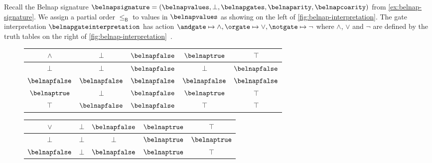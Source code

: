 \documentclass{lmcs}
\begin{document}
\begin{exa}\label{ex:belnap-interpretation}
    Recall the Belnap signature \(
    \belnapsignature = (
    \belnapvalues, \bot, \belnapgates, \belnaparity, \belnapcoarity
    )
    \) from \autoref{ex:belnap-signature}.
    We assign a partial order \(\leq_\mathsf{B}\) to values in
    \(\belnapvalues\) as showing on the left of
    \autoref{fig:belnap-interpretation}.
    The gate interpretation \(\belnapgateinterpretation\) has action \(
    \andgate \mapsto \land, \orgate \mapsto \lor, \notgate \mapsto \neg
    \) where \(\land\), \(\lor\) and \(\neg\) are defined by the truth tables
    on the right of \autoref{fig:belnap-interpretation}~\cite{belnap1977useful}.

    \begin{figure*}
        \centering
        \qquad\qquad
        \begin{tabular}{|c|cccc|}
            \hline
            \(\land\)        & \(\bot\)         & \(\belnapfalse\) & \(\belnaptrue\)  & \(\top\)         \\
            \hline
            \(\bot\)         & \(\bot\)         & \(\belnapfalse\) & \(\bot\)         & \(\belnapfalse\) \\
            \(\belnapfalse\) & \(\belnapfalse\) & \(\belnapfalse\) & \(\belnapfalse\) & \(\belnapfalse\) \\
            \(\belnaptrue\)  & \(\bot\)         & \(\belnapfalse\) & \(\belnaptrue\)  & \(\top\)         \\
            \(\top\)         & \(\belnapfalse\) & \(\belnapfalse\) & \(\top\)         & \(\top\)         \\
            \hline
        \end{tabular}
        \quad
        \begin{tabular}{|c|cccc|}
            \hline
            \(\lor\)         & \(\bot\)        & \(\belnapfalse\) & \(\belnaptrue\) & \(\top\)        \\
            \hline
            \(\bot\)         & \(\bot\)        & \(\bot\)         & \(\belnaptrue\) & \(\belnaptrue\) \\
            \(\belnapfalse\) & \(\bot\)        & \(\belnapfalse\) & \(\belnaptrue\) & \(\top\)        \\

\end{tabular}
\end{figure*}
\end{exa}
\end{document}
